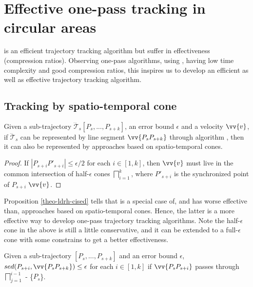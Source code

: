 \section{Effective one-pass tracking in circular areas}
\label{sec:circular}

\ldrh is an efficient trajectory tracking algorithm but suffer in effectiveness (compression ratios).
Observing one-pass algorithms, \cised using \sed, having low time complexity and good compression ratios, this inspires us to develop an efficient as well as effective trajectory tracking algorithm.

\subsection{Tracking by spatio-temporal cone}



\begin{proposition}
\label{theo-ldrh-cised}
Given a sub-trajectory $\dddot{\mathcal{T}}_s[P_s,...,P_{s+k}]$, an error bound $\epsilon$ and a velocity $\vv{v}$, if $\dddot{\mathcal{T}}_s$ can be represented by line segment $\vv{P_sP_{s+k}}$ through algorithm \ldrh, then it can also be represented by approaches based on spatio-temporal cones.
\end{proposition}

\begin{proof}

If $|P_{s+i}P'_{s+i}|\le \epsilon/2$ for each $i \in [1,k]$, then $\vv{v}$ must live in the common intersection of half-$\epsilon$ cones $\bigsqcap_{i=1}^{k}$, where $P'_{s+i}$ is the synchronized point of $P_{s+i}$ \wrt $\vv{v}$.
\end{proof}

Proposition \ref{theo-ldrh-cised} tells that \ldrh is a special case of, and has worse effective than, approaches based on spatio-temporal cones. Hence, the latter is a more effective way to develop one-pass trajectory tracking algorithms. 
Note the half-$\epsilon$ cone in the above is still a little conservative, and it can be extended to a full-$\epsilon$ cone with some constrains to get a better effectiveness.


\begin{proposition}
	\label{theo-full-cone}
	Given a sub-trajectory $[P_s,...,P_{s+k}]$ and an error bound $\epsilon$, $sed(P_{s+i}, \vv{P_sP_{s+k}})\le \epsilon$ for each $i \in [1,k]$ if $\vv{P_sP_{s+i}}$ passes through $\bigsqcap_{j=1}^{i-1}$ - \{$P_s$\}.
\end{proposition}

